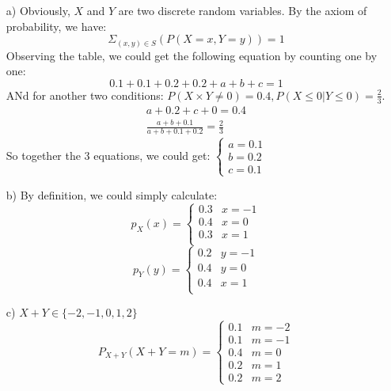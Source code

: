 \documentclass[hidelinks]{article}
\begin{document}
\begin{enumerate}
    \item[a)] Obviously, $X$ and $Y$ are two discrete random variables. By the axiom of probability, we have:
    $$ \Sigma_{(x,y) \in S}(P(X = x,Y = y)) = 1$$
    Observing the table, we could get the following equation by counting one by one:
    \begin{equation*}
        0.1 + 0.1 + 0.2 + 0.2 + a + b + c = 1 \tag{1}         
    \end{equation*}
    ANd for another two conditions: $P(X \times Y \neq 0) = 0.4, P(X \leq 0|Y \leq 0) = \frac{2}{3}$.
    \begin{align*}
        a + 0.2 + c + 0 = 0.4 \tag{2} \\
        \frac{a+b+0.1}{a+b+0.1+0.2} = \frac{2}{3} \tag{3}        
    \end{align*}
    So together the 3 equations, we could get:
    $\begin{cases}
        a = 0.1 \\
        b = 0.2 \\
        c = 0.1
    \end{cases}$
    
    \item[b)] By definition, we could simply calculate:
    \[
    p_X(x) =
    \begin{cases}
        0.3 & x = -1 \\
        0.4 & x = 0  \\
        0.3 & x = 1  \\
    \end{cases}
    \]
    \[
    p_Y(y) =
    \begin{cases}
        0.2 & y = -1 \\
        0.4 & y = 0  \\
        0.4 & x = 1  \\
    \end{cases}
    \]
    \item[c)] $X + Y \in \{-2,-1,0,1,2\}$
    \[
    P_{X+Y}(X+Y = m) = 
    \begin{cases}
     0.1   &  m = -2 \\
     0.1 &  m = -1 \\
     0.4 &  m = 0  \\
     0.2 &  m = 1  \\
     0.2 &  m = 2
    \end{cases}
    \]
\end{enumerate}
\end{document}
